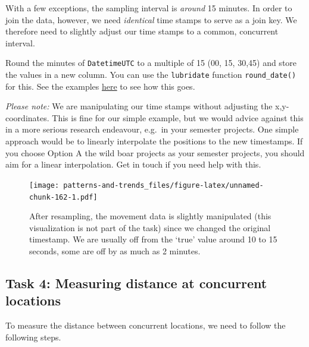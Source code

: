 \documentclass[]{book}
\begin{document}
With a few exceptions, the sampling interval is \emph{around} 15
minutes. In order to join the data, however, we need \emph{identical}
time stamps to serve as a join key. We therefore need to slightly adjust
our time stamps to a common, concurrent interval.

Round the minutes of \texttt{DatetimeUTC} to a multiple of 15 (00, 15,
30,45) and store the values in a new column. You can use the
\texttt{lubridate} function \texttt{round\_date()} for this. See the
examples
\href{https://lubridate.tidyverse.org/reference/round_date.html}{here}
to see how this goes.

\emph{Please note:} We are manipulating our time stamps without
adjusting the x,y-coordinates. This is fine for our simple example, but
we would advice against this in a more serious research endeavour,
e.g.~in your semester projects. One simple approach would be to linearly
interpolate the positions to the new timestamps. If you choose Option A
the wild boar projects as your semester projects, you should aim for a
linear interpolation. Get in touch if you need help with this.

\begin{figure}
\centering
\texttt{[image: patterns-and-trends\_files/figure-latex/unnamed-chunk-162-1.pdf]}
\caption{\label{fig:unnamed-chunk-162}After resampling, the movement data is
slightly manipulated (this visualization is not part of the task) since
we changed the original timestamp. We are usually off from the `true'
value around 10 to 15 seconds, some are off by as much as 2 minutes.}
\end{figure}

\subsection{Task 4: Measuring distance at concurrent
locations}\label{task-4-measuring-distance-at-concurrent-locations}

To measure the distance between concurrent locations, we need to follow
the following steps.
\end{document}
